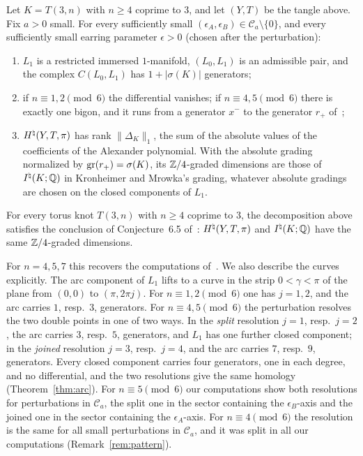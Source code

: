 \begin{theorem}\label{thm:main}
Let $K=T(3,n)$ with $n\ge4$ coprime to $3$, and let $(Y,T)$ be the tangle above. Fix $a>0$ small. For every
sufficiently small $(\epsilon_A,\epsilon_B)\in\mathcal C_a\setminus\{0\}$, and every sufficiently small earring parameter $\epsilon>0$
(chosen after the perturbation):
\begin{enumerate}
\item $L_1$ is a restricted immersed $1$-manifold, $(L_0,L_1)$ is an admissible pair, and the complex
$C(L_0,L_1)$ has $1+|\sigma(K)|$ generators;
\item if $n\equiv1,2\pmod6$ the differential vanishes; if $n\equiv4,5\pmod6$ there is exactly one bigon, and it
runs from a generator $x^-$ to the generator $r_+$ of~\cite[Lemma~5.1]{HHK2};
\item $H^{\natural}(Y,T,\pi)$ has rank $\|\Delta_K\|_1$, the sum of the absolute values of the coefficients of the
Alexander polynomial. With the absolute grading normalized by $\operatorname{gr}(r_+)=\sigma(K)$, its $\mathbb{Z}/4$-graded
dimensions are those of $I^{\natural}(K;\mathbb{Q})$ in Kronheimer and Mrowka's grading, whatever absolute gradings are
chosen on the closed components of $L_1$.
\end{enumerate}
\end{theorem}

\begin{corollary}\label{cor:conj65}
For every torus knot $T(3,n)$ with $n\ge4$ coprime to $3$, the decomposition above satisfies the conclusion of Conjecture~6.5
of~\cite{HHK2}: $H^{\natural}(Y,T,\pi)$ and $I^{\natural}(K;\mathbb{Q})$ have the same $\mathbb{Z}/4$-graded dimensions.
\end{corollary}

For $n=4,5,7$ this recovers the computations of~\cite[\S11]{HHK2}. We also describe the curves explicitly.
The arc component of $L_1$ lifts to a curve in the strip $0<\gamma<\pi$ of the plane from $(0,0)$ to
$(\pi,2\pi j)$. For $n\equiv1,2\pmod6$ one has $j=1,2$, and the arc carries $1$, resp.\ $3$, generators. For
$n\equiv4,5\pmod6$ the perturbation resolves the two double points in one of two ways. In the \emph{split}
resolution $j=1$, resp.\ $j=2$, the arc carries $3$, resp.\ $5$, generators, and $L_1$ has one further closed
component; in the \emph{joined} resolution $j=3$, resp.\ $j=4$, and the arc carries $7$, resp.\ $9$, generators.
Every closed component carries four generators, one in each degree, and no differential, and the two
resolutions give the same homology (Theorem~\ref{thm:arc}). For $n\equiv5\pmod6$ our computations show both
resolutions for perturbations in $\mathcal C_a$, the split one in the sector containing the $\epsilon_B$-axis and the joined
one in the sector containing the $\epsilon_A$-axis. For $n\equiv4\pmod6$ the resolution is the same for all small perturbations in $\mathcal C_a$, and it
was split in all our computations (Remark~\ref{rem:pattern}).

